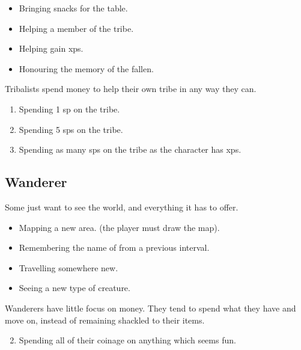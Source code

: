 \begin{multicols}{2}
\begin{itemize}
  \item
  Bringing snacks for the table.
  \item
  Helping a member of the tribe.
  \item
  Helping  gain \glspl{xp}.
  \item
  Honouring the memory of the fallen.
\end{itemize}

Tribalists spend money to help their own tribe in any way they can.

\begin{enumerate}
  \item
  Spending 1 \gls{sp} on the tribe.
  \item
  Spending 5 \glspl{sp} on the tribe.
  \item
  Spending as many \glspl{sp} on the tribe as the character has \glspl{xp}.
\end{enumerate}

\subsection{Wanderer}
\label{wanderer}

Some just want to see the world, and everything it has to offer.

\begin{itemize}

  \item
  Mapping a new area. (the player must draw the map).
  \item
  Remembering the name of  from a previous \gls{interval}.
  \item
  Travelling somewhere new.
  \item
  Seeing a new type of creature.

\end{itemize}

Wanderers have little focus on money.
They tend to spend what they have and move on, instead of remaining shackled to their items.

\begin{enumerate}
  \setcounter{enumi}{1}
  \item
  Spending all of their coinage on anything which seems fun.
\end{enumerate}


\end{multicols}

\section{}
\label{xpCosts}

